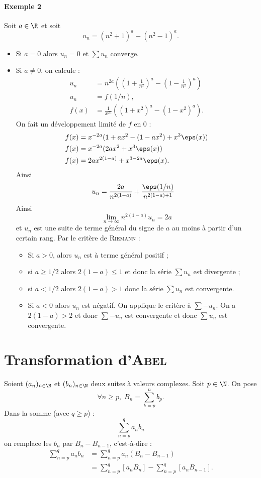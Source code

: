 \paragraph{Exemple 2}Soit $a\in \R$ et soit \[ u_n = (n^{2}+1)^{a} - (n^{2}-1)^{a}.\]
\begin{itemize}
\item Si $a = 0$ alors $u_n=0$ et $\sum u_n$ converge.
\item Si $a\neq 0$, on calcule :
\begin{align*}
u_n &= n^{2a}\left( \left( 1 + \frac{1}{n^{2}}\right)^{a} - \left(1-\frac{1}{n^{2}}\right)^{a}\right) \\
u_n &= f(1/n),\\
f(x) &= \frac{1}{x^{2a}}\left( (1+ x^{2})^{a} -(1-x^{2})^{a}\right).
\end{align*}
On fait un développement limité de $f$ en $0$ :
\begin{align*}
f(x) &= x^{-2a}(1+ax^{2}-(1-ax^{2}) + x^{3}\eps(x)) \\
f(x) &= x^{-2a}(2ax^{2}+x^{3}\eps(x))\\
f(x) &= 2ax^{2(1-a)} + x^{3-2a}\eps(x).
\end{align*}
Ainsi 
\begin{align*}
u_n &= \frac{2a}{n^{2(1-a)}} + \frac{\eps(1/n)}{n^{2(1-a)+1}}
\end{align*}
Ainsi \[ \lim_{n\to\infty} n^{2(1-a)}u_n = 2a \]et $u_n$ est une suite de terme général du signe de $a$ au moins à partir d'un certain rang.
Par le critère de \textsc{Riemann} :
\begin{itemize}
\item Si $a>0$, alors $u_n$ est à terme général positif ;
\item si $a\geq 1/2$ alors $2(1-a)\leq 1$ et donc la série $\sum u_n$ est divergente ;
\item si $a<1/2$ alors $2(1-a)>1$ donc la série $\sum u_n$ est convergente.
\item Si $a<0$ alors $u_n$ est négatif. On applique le critère à $\sum -u_n$. On a $2(1-a)>2$ et donc $\sum -u_n$ est convergente et donc $\sum u_n$ est convergente.
\end{itemize}
\end{itemize}

\section{Transformation d'\textsc{Abel}}

Soient $(a_n)_{n\in \N}$ et $(b_n)_{n\in \N}$ deux suites à valeurs complexes. Soit $p\in \N$. On pose \[ \forall n\geq p, \; B_n = \sum_{k=p}^{n} b_p.\] Dans la somme (avec $q\geq p$) : \[ \sum_{n=p}^{q}a_nb_n\]on remplace les $b_n$ par $B_n - B_{n-1}$, c'est-à-dire :
\begin{align*}
\sum_{n=p}^{q}a_nb_n &= \sum_{n=p}^{q}a_n(B_n-B_{n-1})\\
&= \sum_{n=p}^{q}[a_nB_n]  - \sum_{n=p}^{q}[a_nB_{n-1}].
\end{align*}

